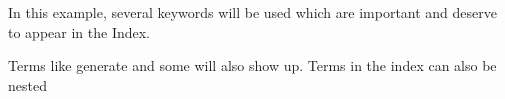 
In this example, several keywords will be 
used which are important and deserve to appear in the 
Index.

Terms like generate and some 
will also show up. Terms in the index can also be 
nested 



\clearpage
\printindex



